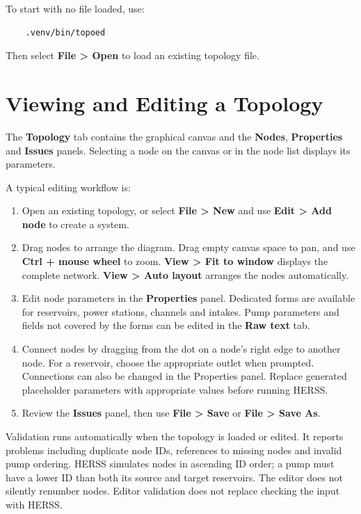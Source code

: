 \documentclass[a4paper, 12pt]{report}
\begin{document}
To start with no file loaded, use:

\begin{lstlisting}
	.venv/bin/topoed
\end{lstlisting}

Then select \textbf{File > Open} to load an existing topology file.

\section{Viewing and Editing a Topology}

The \textbf{Topology} tab contains the graphical canvas and the
\textbf{Nodes}, \textbf{Properties} and \textbf{Issues} panels.
Selecting a node on the canvas or in the node list displays its
parameters.

A typical editing workflow is:

\begin{enumerate}
	\item Open an existing topology, or select \textbf{File > New}
	and use \textbf{Edit > Add node} to create a system.
	
	\item Drag nodes to arrange the diagram. Drag empty canvas space
	to pan, and use \textbf{Ctrl + mouse wheel} to zoom.
	\textbf{View > Fit to window} displays the complete network.
	\textbf{View > Auto layout} arranges the nodes automatically.
	
	\item Edit node parameters in the \textbf{Properties} panel.
	Dedicated forms are available for reservoirs, power stations,
	channels and intakes. Pump parameters and fields not covered
	by the forms can be edited in the \textbf{Raw text} tab.
	
	\item Connect nodes by dragging from the dot on a node's right
	edge to another node. For a reservoir, choose the appropriate
	outlet when prompted. Connections can also be changed in the
	Properties panel. Replace generated placeholder parameters
	with appropriate values before running HERSS.
	
	\item Review the \textbf{Issues} panel, then use
	\textbf{File > Save} or \textbf{File > Save As}.
\end{enumerate}

Validation runs automatically when the topology is loaded or edited.
It reports problems including duplicate node IDs, references to
missing nodes and invalid pump ordering. HERSS simulates nodes in
ascending ID order; a pump must have a lower ID than both its source
and target reservoirs. The editor does not silently renumber nodes.
Editor validation does not replace checking the input with HERSS.
\end{document}
